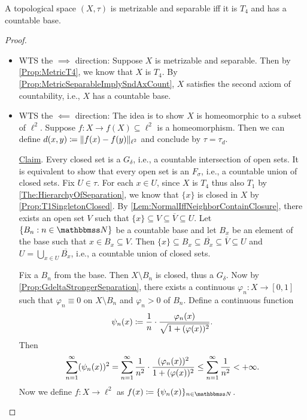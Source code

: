 \documentclass[screen,single]{techreport}
\numberwithin{equation}{section}
\begin{document}
\begin{theorem}\label{The:UrysohnMetrization}
  A topological space $(X,\tau)$ is metrizable and separable iff it is $T_4$ and has a countable base.
\end{theorem}
\begin{proof}\
  \begin{itemize}
    \item WTS the $\implies$ direction: Suppose $X$ is metrizable and separable.
    Then by \cref{Prop:MetricT4}, we know that $X$ is $T_4$.
    By \cref{Prop:MetricSeparableImplySndAxCount}, $X$ satisfies the second axiom of countability, i.e., $X$ has a countable base.
    
    \item WTS the $\impliedby$ direction: The idea is to show $X$ is homeomorphic to a subset of $\ell^2$. Suppose $f : X \to f(X) \subseteq \ell^2$ is a homeomorphism. Then we can define $d(x,y) \coloneqq \|{f(x) - f(y)}\|_{\ell^2}$ and conclude by $\tau = \tau_d$.
    
    \underline{Claim}. Every closed set is a $G_\delta$, i.e., a countable intersection of open sets.
    It is equivalent to show that every open set is an $F_\sigma$, i.e., a countable union of closed sets.
    Fix $U \in \tau$.
    For each $x \in U$, since $X$ is $T_4$ thus also $T_1$ by \cref{The:HierarchyOfSeparation}, we know that $\{x\}$ is closed in $X$ by \cref{Prop:T1SingletonClosed}.
    By \cref{Lem:NormalIffNeighborContainClosure}, there exists an open set $V$ such that $\{x\}\subseteq V \subseteq \overline{V} \subseteq U$.
    Let $\{B_n : n \in \bbN\}$ be a countable base and let $B_x$ be an element of the base such that $x \in B_x \subseteq V$.
    Then $\{x\} \subseteq B_x \subseteq \overline{B_x} \subseteq \overline{V} \subseteq U$ and $U = \bigcup_{x \in U} \overline{B_x}$, i.e., a countable union of closed sets.
    
    Fix a $B_n$ from the base.
    Then $X \setminus B_n$ is closed, thus a $G_\delta$.
    Now by \cref{Prop:GdeltaStrongerSeparation}, there exists a continuous $\varphi_n : X \to [0,1]$ such that $\varphi_n \equiv 0$ on $X \setminus B_n$ and $\varphi_n > 0$ of $B_n$.
    Define a continuous function
    \[
    \psi_n(x) \coloneqq \frac{1}{n} \cdot \frac{\varphi_n(x)}{\sqrt{1 + ({ \varphi(x)})^2}}.
    \]
    Then
    \[
    \sum_{n=1}^\infty ({ \psi_n(x)})^2 = \sum_{n=1}^\infty \frac{1}{n^2} \cdot \frac{({\varphi_n(x)})^2}{1 + ({ \varphi(x) })^2} \le \sum_{n=1}^\infty \frac{1}{n^2} < +\infty.
    \]
    Now we define $f : X \to \ell^2$ as $f(x) \coloneqq \{ \psi_n(x) \}_{n \in \bbN}$.
    

\end{itemize}
\end{proof}
\end{document}
